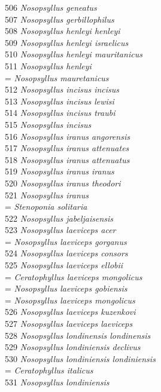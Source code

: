 \documentclass[
]{article}
\begin{document}
506 \emph{Nosopsyllus geneatus}\\
507 \emph{Nosopsyllus gerbillophilus}\\
508 \emph{Nosopsyllus henleyi henleyi}\\
509 \emph{Nosopsyllus henleyi israelicus}\\
510 \emph{Nosopsyllus henleyi mauritanicus}\\
511 \emph{Nosopsyllus henleyi}\\
= \emph{Nosopsyllus mauretanicus}\\
512 \emph{Nosopsyllus incisus incisus}\\
513 \emph{Nosopsyllus incisus lewisi}\\
514 \emph{Nosopsyllus incisus traubi}\\
515 \emph{Nosopsyllus incisus}\\
516 \emph{Nosopsyllus iranus angorensis}\\
517 \emph{Nosopsyllus iranus attenuates}\\
518 \emph{Nosopsyllus iranus attenuatus}\\
519 \emph{Nosopsyllus iranus iranus}\\
520 \emph{Nosopsyllus iranus theodori}\\
521 \emph{Nosopsyllus iranus}\\
= \emph{Stenoponia solitaria}\\
522 \emph{Nosopsyllus jabeljaisensis}\\
523 \emph{Nosopsyllus laeviceps acer}\\
= \emph{Nosopsyllus laeviceps gorganus}\\
524 \emph{Nosopsyllus laeviceps consors}\\
525 \emph{Nosopsyllus laeviceps ellobii}\\
= \emph{Ceratophyllus laeviceps mongolicus}\\
= \emph{Nosopsyllus laeviceps gobiensis}\\
= \emph{Nosopsyllus laeviceps mongolicus}\\
526 \emph{Nosopsyllus laeviceps kuzenkovi}\\
527 \emph{Nosopsyllus laeviceps laeviceps}\\
528 \emph{Nosopsyllus londinensis londinensis}\\
529 \emph{Nosopsyllus londiniensis declivus}\\
530 \emph{Nosopsyllus londiniensis londiniensis}\\
= \emph{Ceratophyllus italicus}\\
531 \emph{Nosopsyllus londiniensis}\\
\end{document}
